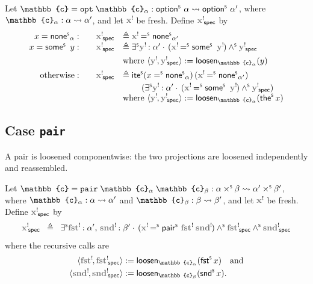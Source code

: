 \begin{definition}
Let $\mathbb{c} = \mathtt{opt}\;\mathbb{c}_\alpha : \castpath{\optS\,\alpha}{\optS\,\alpha'}$, where $\mathbb{c}_\alpha : \castpath{\alpha}{\alpha'}$, and let $\lvar{x}$ be fresh. Define $\spec{\lvar{x}}$ by
\[
\begin{array}{r@{\qquad}rl}
x = \noneS_{\alpha}: & \spec{\lvar{x}} &\triangleq \lvar{x} \eqS \noneS_{\alpha'}\\
x = \someS\ y : & \spec{\lvar{x}} &\triangleq \existsS \lvar{y} : \alpha'\cdot\, (\lvar{x} \eqS \someS\ \lvar{y}) \andS \spec{\lvar{y}} \\[1ex]
& & \text{where } \langle \lvar{y}, \spec{\lvar{y}} \rangle := \mathsf{loosen}_{\mathbb{c}_\alpha}(y)\\[1ex]
\text{otherwise}: & \spec{\lvar{x}} &\triangleq
\begin{aligned}[t]
&\iteS (x \eqS \noneS_{\alpha})\, (\lvar{x} \eqS \noneS_{\alpha'})\\
&\quad \left(\existsS \lvar{y} : \alpha'\cdot\, (\lvar{x} \eqS \someS\ \lvar{y}) \andS \spec{\lvar{y}}\right)
\end{aligned} \\
& & \text{where } \langle \lvar{y}, \spec{\lvar{y}} \rangle := \mathsf{loosen}_{\mathbb{c}_\alpha}(\theS x)
\end{array}
\]
\end{definition}


\subsection{Case \texttt{pair}}\label{case:pair}
A pair is loosened componentwise: the two projections are loosened independently and reassembled.

\begin{definition}
Let $\mathbb{c} = \mathtt{pair}\;\mathbb{c}_\alpha\;\mathbb{c}_\beta : \castpath{\alpha \timesS \beta}{\alpha' \timesS \beta'}$, where $\mathbb{c}_\alpha : \castpath{\alpha}{\alpha'}$ and $\mathbb{c}_\beta : \castpath{\beta}{\beta'}$, and let $\lvar{x}$ be fresh. Define $\spec{\lvar{x}}$ by
\[
\spec{\lvar{x}} \;\;\triangleq\;\; \existsS \lvar{fst} : \alpha',\, \lvar{snd} : \beta'\cdot\, (\lvar{x} \eqS \pairS{\lvar{fst}}{\lvar{snd}}) \andS \spec{\lvar{fst}} \andS \spec{\lvar{snd}}
\]
where the recursive calls are
\[
  \begin{aligned}
    \langle \lvar{fst}, \spec{\lvar{fst}} \rangle &:= \mathsf{loosen}_{\mathbb{c}_\alpha}(\fstS{x})\quad\text{and}\\
    \langle \lvar{snd}, \spec{\lvar{snd}} \rangle &:= \mathsf{loosen}_{\mathbb{c}_\beta}(\sndS{x}).
  \end{aligned}
\]
\end{definition}

